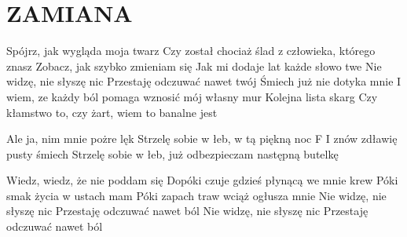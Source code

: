 \documentclass[../../../songbook.tex]{subfiles}
\begin{document}
\TabPositions{8cm} %
\section*{ZAMIANA}
{}
\vspace{0.5cm}
Spójrz, jak wygląda moja twarz							 \newline
Czy został chociaż ślad z człowieka, którego znasz		 \newline  
Zobacz, jak szybko zmieniam się							 \newline
Jak mi dodaje lat każde słowo twe							 \newline
Nie widzę, nie słyszę nic							 \newline
Przestaję odczuwać nawet twój							 \newline
Śmiech już nie dotyka mnie 							 \newline
I wiem, ze każdy ból pomaga wznosić mój własny mur							 \newline
Kolejna lista skarg							 \newline
Czy kłamstwo to, czy żart, wiem to banalne jest							 \newline

\-\hspace{1cm} Ale ja, nim mnie pożre lęk					 \newline
\-\hspace{1cm} Strzelę sobie w łeb, w tą piękną noc	F		 \newline
\-\hspace{1cm} I znów zdławię pusty śmiech 							 \newline
\-\hspace{1cm} Strzelę sobie w łeb, już odbezpieczam następną butelkę							 \newline

Wiedz, wiedz, że nie poddam się							 \newline
Dopóki czuje gdzieś płynącą we mnie krew							 \newline
Póki smak życia w ustach mam							 \newline
Póki zapach traw wciąż ogłusza mnie 							 \newline
Nie widzę, nie słyszę nic							 \newline
Przestaję odczuwać nawet ból							 \newline
Nie widzę, nie słyszę nic							 \newline
Przestaję odczuwać nawet ból							 \newline
     
\end{document}
